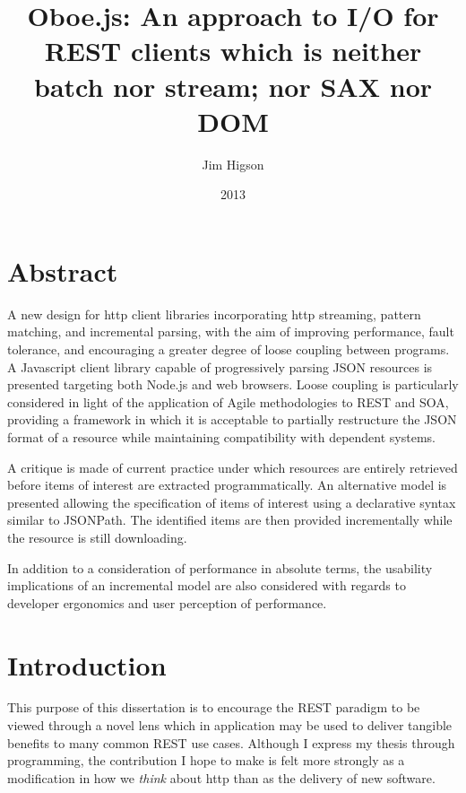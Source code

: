 \documentclass[12pt, ]{article}
\title{Oboe.js: An approach to I/O for REST clients which is neither batch nor
stream; nor SAX nor DOM}
\author{Jim Higson}
\date{2013}
\let\stdsection\section
\renewcommand\section{\newpage\stdsection}
\begin{document}
\maketitle


{
\clearpage
\hypersetup{linkcolor=black}
\setcounter{tocdepth}{3}
\tableofcontents
}

\clearpage
\listoffigures

\clearpage

\section{Abstract}\label{abstract}

A new design for http client libraries incorporating http streaming,
pattern matching, and incremental parsing, with the aim of improving
performance, fault tolerance, and encouraging a greater degree of loose
coupling between programs. A Javascript client library capable of
progressively parsing JSON resources is presented targeting both Node.js
and web browsers. Loose coupling is particularly considered in light of
the application of Agile methodologies to REST and SOA, providing a
framework in which it is acceptable to partially restructure the JSON
format of a resource while maintaining compatibility with dependent
systems.

A critique is made of current practice under which resources are
entirely retrieved before items of interest are extracted
programmatically. An alternative model is presented allowing the
specification of items of interest using a declarative syntax similar to
JSONPath. The identified items are then provided incrementally while the
resource is still downloading.

In addition to a consideration of performance in absolute terms, the
usability implications of an incremental model are also considered with
regards to developer ergonomics and user perception of performance.

\section{Introduction}\label{introduction}

This purpose of this dissertation is to encourage the REST paradigm to
be viewed through a novel lens which in application may be used to
deliver tangible benefits to many common REST use cases. Although I
express my thesis through programming, the contribution I hope to make
is felt more strongly as a modification in how we \emph{think} about
http than as the delivery of new software.
\end{document}
